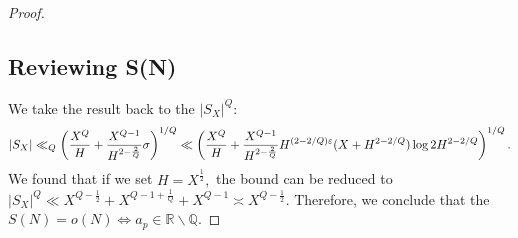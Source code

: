 \begin{proof}
\subsection{Reviewing S(N)}
We take the result back to the $|S_X|^Q$: $$\left\lvert S_X \right\rvert \ll_Q \left( \frac{X^Q}{H} + \frac{X^{Q-1}}{H^{2-\frac{2}{Q}}} \sigma \right)^{1/Q} \ll \left( \frac{X^Q}{H} + \frac{X^{Q-1}}{H^{2-\frac{2}{Q}}} H^{(2-2/Q)\varepsilon} (X+H^{2-2/Q}) \log{2H^{2-2/Q}}\right)^{1/Q}.$$ We found that if we set $H = X^\frac{1}{2},$ the bound can be reduced to $|S_X|^Q \ll X^{Q-\frac12} + X^{Q-1+\frac1Q} + X^{Q-1} \asymp X^{Q-\frac12}.$ Therefore, we conclude that the $S(N) = o(N) \iff a_p \in \mathbb{R \backslash Q}.$ 
\end{proof}
